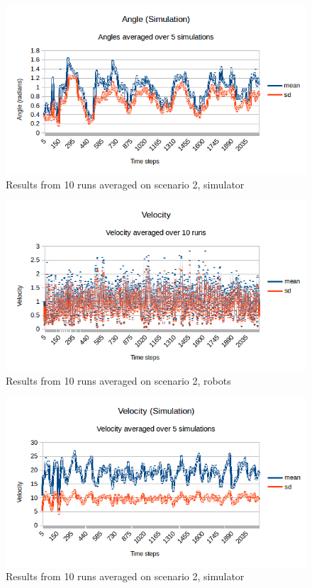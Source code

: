 \begin{figure}[h]
\begin{center}
\includegraphics[width=0.8\linewidth]{figs/runs/2sangle}
\end{center}
\caption[2. Distances, robots]{Results from 10 runs averaged on scenario 2, simulator}
\label{fig:res2sang}
\end{figure}
\begin{figure}[h]
\begin{center}
\includegraphics[width=0.8\linewidth]{figs/runs/2pvel}
\end{center}
\caption[2. Velocity, robots]{Results from 10 runs averaged on scenario 2, robots}
\label{fig:res2pvel}
\end{figure}
\begin{figure}[h]
\begin{center}
\includegraphics[width=0.8\linewidth]{figs/runs/2svel}
\end{center}
\caption[2. Velocity, robots]{Results from 10 runs averaged on scenario 2, simulator}
\label{fig:res2svel}
\end{figure}
\clearpage
